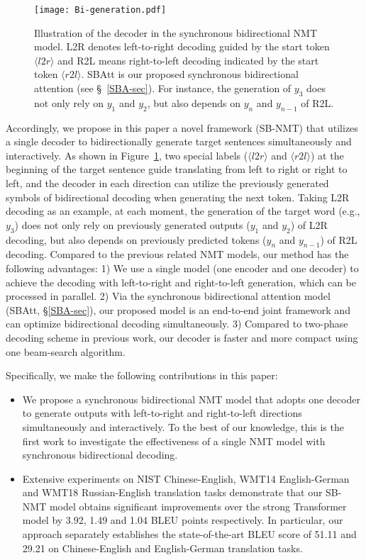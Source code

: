 \documentclass[11pt,a4paper]{article}
\begin{document}
\begin{CJK*}{UTF8}{gbsn}
\begin{figure}
    \centering
    \texttt{[image: Bi-generation.pdf]}
    \caption{Illustration of the decoder in the synchronous bidirectional NMT model. L2R denotes left-to-right decoding guided by the start token $\langle l2r \rangle$ and R2L means right-to-left decoding indicated by the start token $\langle r2l \rangle$.
    SBAtt is our proposed synchronous bidirectional attention (see \S~\ref{SBA-sec}).
    For instance, the generation of $y_3$ does not only rely on $y_1$ and $y_2$, but also depends on $y_n$ and $y_{n-1}$ of R2L.
    }\label{Bi-generation}
\end{figure}

Accordingly, we propose in this paper a novel framework (SB-NMT) that utilizes a single decoder to bidirectionally generate target sentences simultaneously and interactively.
As shown in Figure~\ref{Bi-generation}, two special labels ($\langle l2r \rangle$ and $\langle r2l \rangle$) at the beginning of the target sentence guide translating from left to right or right to left, and the decoder in each direction can utilize the previously generated symbols of bidirectional decoding when generating the next token.
Taking L2R decoding as an example, at each moment, the generation of the target word (e.g., $y_3$) does not only rely on previously generated outputs ($y_1$ and $y_2$) of L2R decoding, but also depends on previously predicted tokens ($y_n$ and $y_{n-1}$) of R2L decoding. Compared to the previous related NMT models, our method has the following advantages:
1) We use a single model (one encoder and one decoder) to achieve the decoding with left-to-right and right-to-left generation, which can be processed in parallel.
2) Via the synchronous bidirectional attention model (SBAtt, \S\ref{SBA-sec}), our proposed model is an end-to-end joint framework and can optimize bidirectional decoding simultaneously.
3) Compared to two-phase decoding scheme in previous work, our decoder is faster and more compact using one beam-search algorithm.

Specifically, we make the following contributions in this paper:
\begin{itemize}
\item We propose a synchronous bidirectional NMT model that adopts one decoder to generate outputs with left-to-right and right-to-left directions simultaneously and interactively.
To the best of our knowledge, this is the first work to investigate the effectiveness of a single NMT model with synchronous bidirectional decoding.
\item Extensive experiments on NIST Chinese-English, WMT14 English-German and WMT18 Russian-English translation tasks demonstrate that our SB-NMT model obtains significant improvements over the strong Transformer model by 3.92, 1.49 and 1.04 BLEU points respectively.
In particular, our approach separately establishes the state-of-the-art BLEU score of 51.11 and 29.21 on Chinese-English and English-German translation tasks.
\end{itemize}


\end{CJK*}
\end{document}
